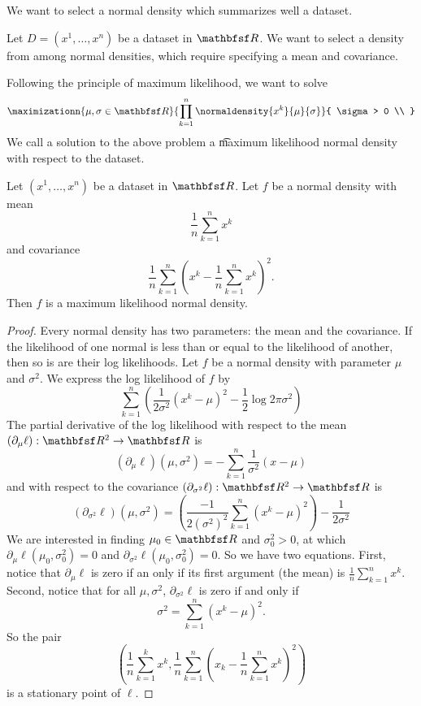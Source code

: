 
We want to select a normal density which summarizes well a dataset.


Let $D = (x^1, \dots, x^n)$ be a dataset in $\R$.
We want to select a density from among normal densities, which require specifying a mean and covariance.

Following the principle of maximum likelihood, we want to solve
\[
  \maximizationn{\mu,\sigma \in \R}{
    \prod_{k = 1}^{n}  \normaldensity{x^k}{\mu}{\sigma}
  }{
    \sigma > 0 \\
  }
\]
We call a solution to the above problem a \t{maximum likelihood normal density} with respect to the dataset.


\begin{prop}

Let $(x^1, \dots, x^n)$ be a dataset in $\R$.
Let $f$ be a normal density with mean
$$\frac{1}{n} \sum_{k = 1}^{n} x^k$$
and covariance
$$\frac{1}{n} \sum_{k = 1}^{n} \left(x^k - \frac{1}{n} \sum_{k = 1}^{n} x^k\right)^2.$$
Then $f$ is a maximum likelihood normal density.
\begin{proof}
  Every normal density has two parameters: the mean
  and the covariance.
  If the likelihood of one normal is less than or equal
  to the likelihood of another, then so is are their
  log likelihoods.
  Let $f$ be a normal density with parameter $\mu$ and $\sigma^2$.
  We express the log likelihood of
  $f$ by
  \[
    \sum_{k = 1}^{n} \left( \frac{1}{2\sigma^2}(x^k - \mu)^2 - \frac{1}{2}\log2\pi\sigma^2\right)
  \]
  The partial derivative of the log likelihood with
  respect to the mean $(\partial_{\mu} \ell): \R^2 \to \R$ is
  \[
    (\partial_\mu \ell)(\mu, \sigma^2) = - \sum_{k = 1}^{n} \frac{1}{\sigma^2}(x - \mu)
  \]
  and with respect to the covariance $(\partial_{\sigma^2} \ell): \R^2 \to \R$ is
  \[
    (\partial_{\sigma^2} \ell)(\mu, \sigma^2) =
    \left(\frac{-1}{2(\sigma^2)^{2}}\sum_{k = 1}^{n}(x^k - \mu)^2\right)- \frac{1}{2\sigma^2}
  \]
  We are interested in finding $\mu_0 \in \R$ and $\sigma^2_0 > 0$, at which
  $\partial_\mu \ell(\mu_0, \sigma^2_0) = 0$ and
  $\partial_{\sigma^2} \ell(\mu_0, \sigma^2_0) = 0$.
  So we have two equations.
  First, notice that
  $\partial_\mu \ell$ is zero if an only if
  its first argument (the mean) is $\frac{1}{n} \sum_{k = 1}^{n} x^k$.
  Second, notice that for all $\mu, \sigma^2$,
  $\partial_{\sigma^2}\ell$ is zero if and only if
  \[
    \sigma^2 = \sum_{k = 1}^{n} (x^k - \mu)^2.
  \]
  So the pair
  \[
    \left(\frac{1}{n}\sum_{k = 1}^{k} x^k, \frac{1}{n} \sum_{k = 1}^{n} (x_k - \frac{1}{n} \sum_{k = 1}^{n}  x^k)^2\right)
  \]
  is a stationary point of $\ell$.
\end{proof}
\end{prop}
\strats

